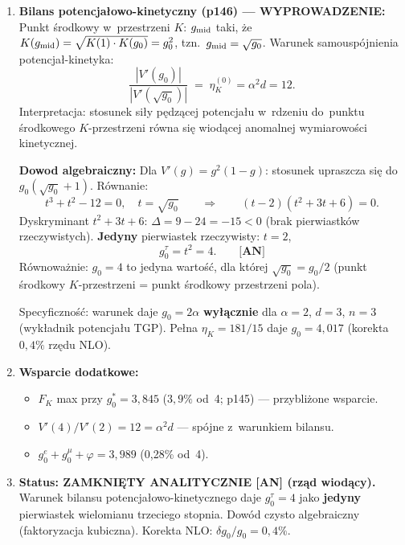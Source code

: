 \begin{enumerate}
  \item \textbf{Bilans potencja\l{}owo-kinetyczny (p146) --- WYPROWADZENIE:}
    Punkt \'srodkowy w~przestrzeni $K$: $g_{\rm mid}$ taki,
    \.ze $K(g_{\rm mid}) = \sqrt{K(1)\cdot K(g_0)} = g_0^2$,
    tzn.\ $g_{\rm mid} = \sqrt{g_0}$.
    Warunek samousp\'ojnienia potencja\l{}-kinetyka:
    \begin{equation}
      \frac{|V'(g_0)|}{|V'(\sqrt{g_0})|}
      \;=\; \eta_K^{(0)} = \alpha^2 d = 12.
    \end{equation}
    Interpretacja: stosunek si\l{}y p\k{e}dz\k{a}cej potencja\l{}u
    w~rdzeniu do~punktu \'srodkowego $K$-przestrzeni
    r\'owna si\k{e} wiod\k{a}cej anomalnej wymiarowo\'sci kinetycznej.

    \textbf{Dowod algebraiczny:}
    Dla $V'(g) = g^2(1-g)$: stosunek upraszcza si\k{e} do
    $g_0(\sqrt{g_0}+1)$. R\'ownanie:
    \begin{equation}
      \boxed{t^3 + t^2 - 12 = 0,\quad t = \sqrt{g_0}}
      \qquad\Longrightarrow\qquad
      (t-2)(t^2+3t+6) = 0.
    \end{equation}
    Dyskryminant $t^2+3t+6$: $\Delta = 9 - 24 = -15 < 0$ (brak
    pierwiastk\'ow rzeczywistych).
    \textbf{Jedyny} pierwiastek rzeczywisty: $t = 2$,
    \begin{equation}
      \boxed{g_0^\tau = t^2 = 4.} \qquad\textbf{[AN]}
    \end{equation}
    R\'ownowa\.znie: $g_0 = 4$ to jedyna warto\'s\'c, dla kt\'orej
    $\sqrt{g_0} = g_0/2$ (punkt \'srodkowy $K$-przestrzeni = punkt
    \'srodkowy przestrzeni pola).

    Specyficzno\'s\'c: warunek daje $g_0 = 2\alpha$ \textbf{wy\l{}\k{a}cznie}
    dla $\alpha = 2$, $d = 3$, $n = 3$ (wyk\l{}adnik potencja\l{}u TGP).
    Pe\l{}na $\eta_K = 181/15$ daje $g_0 = 4{,}017$ (korekta $0{,}4\%$
    rz\k{e}du NLO).

  \item \textbf{Wsparcie dodatkowe:}
    \begin{itemize}[nosep]
      \item $F_K$ max przy $g_0^* = 3{,}845$ ($3{,}9\%$ od~4; p145) ---
            przybli\.zone wsparcie.
      \item $V'(4)/V'(2) = 12 = \alpha^2 d$ --- sp\'ojne z~warunkiem bilansu.
      \item $g_0^e + g_0^\mu + \varphi = 3{,}989$ (0{,}28\% od~4).
    \end{itemize}

  \item \textbf{Status: ZAMKNI\k{E}TY ANALITYCZNIE [AN] (rz\k{a}d wiod\k{a}cy).}
    Warunek bilansu potencja\l{}owo-kinetycznego daje $g_0^\tau = 4$
    jako \textbf{jedyny} pierwiastek wielomianu trzeciego stopnia.
    Dow\'od czysto algebraiczny (faktoryzacja kubiczna).
    Korekta NLO: $\delta g_0 / g_0 = 0{,}4\%$.


\end{enumerate}

